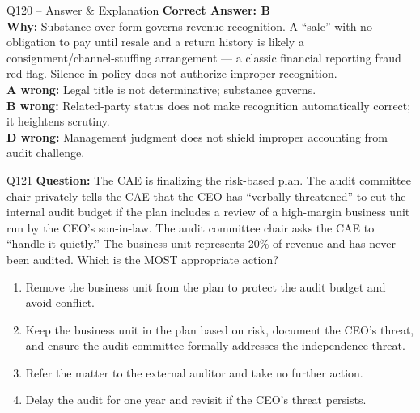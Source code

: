\documentclass[aspectratio=169,10pt]{beamer}
\begin{document}
	\begin{frame}[t]{Q120 -- Answer \& Explanation}
		\small
		\textbf{Correct Answer: B} \\[4pt]
		\textbf{Why:} Substance over form governs revenue recognition. A ``sale'' with no obligation to pay until resale and a return history is likely a consignment/channel-stuffing arrangement --- a classic financial reporting fraud red flag. Silence in policy does not authorize improper recognition. \\[4pt]
		\textbf{A wrong:} Legal title is not determinative; substance governs. \\[2pt]
		\textbf{B wrong:} Related-party status does not make recognition automatically correct; it heightens scrutiny. \\[2pt]
		\textbf{D wrong:} Management judgment does not shield improper accounting from audit challenge.
	\end{frame}
	
	\begin{frame}[t]{Q121}
		\small
		\textbf{Question:} The CAE is finalizing the risk-based plan. The audit committee chair privately tells the CAE that the CEO has ``verbally threatened'' to cut the internal audit budget if the plan includes a review of a high-margin business unit run by the CEO's son-in-law. The audit committee chair asks the CAE to ``handle it quietly.'' The business unit represents 20\% of revenue and has never been audited. Which is the MOST appropriate action?
		\begin{enumerate}[label=\Alph*.,itemsep=1pt,topsep=2pt]
			\item Remove the business unit from the plan to protect the audit budget and avoid conflict.
			\item Keep the business unit in the plan based on risk, document the CEO's threat, and ensure the audit committee formally addresses the independence threat.
			\item Refer the matter to the external auditor and take no further action.
			\item Delay the audit for one year and revisit if the CEO's threat persists.
		\end{enumerate}
	\end{frame}
	
\end{document}
